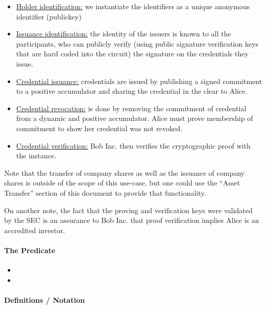 \begin{itemize}
    \item \underline{Holder identification:} we instantiate the identifiers as a unique anonymous identifier (publickey)
    \item \underline{Issuance identification:} the identity of the issuers is known to all the participants, who can publicly verify (using public signature verification keys that are hard coded into the circuit) the signature on the credentials they issue.
    \item \underline{Credential issuance:} credentials are issued by publishing a signed commitment to a positive accumulator and sharing the credential in the clear to Alice.
    \item \underline{Credential revocation:} is done by removing the commitment of credential from a dynamic and positive accumulator. 
		Alice must prove membership of commitment to show her credential was not revoked.
    \item \underline{Credential verification:} Bob Inc. then verifies the cryptographic proof with the instance.
\end{itemize}


Note that the transfer of company shares as well as the issuance of company shares is outside of the scope of this use-case, but one could use the ``Asset Transfer'' section of this document to provide that functionality. 

On another note, the fact that the proving and verification keys were validated by the SEC is an assurance to Bob Inc. that proof verification implies Alice is an accredited investor.


\paragraph[:]{The Predicate}
\begin{itemize}
\item {}
\item {}
\end{itemize}



\paragraph[:]{Definitions / Notation}

